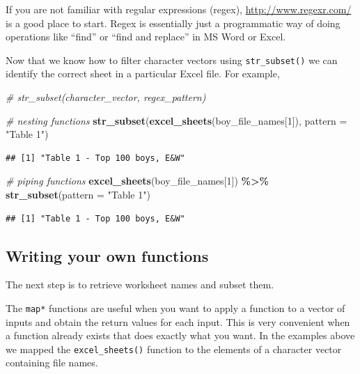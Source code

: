 \documentclass[
]{book}
\newenvironment{Shaded}{\begin{snugshade}}{\end{snugshade}}
\newcommand{\CommentTok}[1]{\textcolor[rgb]{0.56,0.35,0.01}{\textit{#1}}}
\newcommand{\DataTypeTok}[1]{\textcolor[rgb]{0.13,0.29,0.53}{#1}}
\newcommand{\DecValTok}[1]{\textcolor[rgb]{0.00,0.00,0.81}{#1}}
\newcommand{\KeywordTok}[1]{\textcolor[rgb]{0.13,0.29,0.53}{\textbf{#1}}}
\newcommand{\NormalTok}[1]{#1}
\newcommand{\OperatorTok}[1]{\textcolor[rgb]{0.81,0.36,0.00}{\textbf{#1}}}
\newcommand{\StringTok}[1]{\textcolor[rgb]{0.31,0.60,0.02}{#1}}
\begin{document}
If you are not familiar with regular expressions (regex),
\url{http://www.regexr.com/} is a good place to start. Regex is essentially
just a programmatic way of doing operations like ``find'' or ``find and replace''
in MS Word or Excel.

Now that we know how to filter character vectors using \texttt{str\_subset()} we can
identify the correct sheet in a particular Excel file. For example,

\begin{Shaded}
\begin{Highlighting}[]
\CommentTok{\# str\_subset(character\_vector, regex\_pattern)}

\CommentTok{\# nesting functions}
\KeywordTok{str\_subset}\NormalTok{(}\KeywordTok{excel\_sheets}\NormalTok{(boy\_file\_names[}\DecValTok{1}\NormalTok{]), }\DataTypeTok{pattern =} \StringTok{"Table 1"}\NormalTok{)}
\end{Highlighting}
\end{Shaded}

\begin{verbatim}
## [1] "Table 1 - Top 100 boys, E&W"
\end{verbatim}

\begin{Shaded}
\begin{Highlighting}[]
\CommentTok{\# piping functions}
\KeywordTok{excel\_sheets}\NormalTok{(boy\_file\_names[}\DecValTok{1}\NormalTok{]) }\OperatorTok{\%\textgreater{}\%}\StringTok{ }\KeywordTok{str\_subset}\NormalTok{(}\DataTypeTok{pattern =} \StringTok{"Table 1"}\NormalTok{)}
\end{Highlighting}
\end{Shaded}

\begin{verbatim}
## [1] "Table 1 - Top 100 boys, E&W"
\end{verbatim}

\hypertarget{writing-your-own-functions}{%
\subsection{Writing your own functions}\label{writing-your-own-functions}}

The next step is to retrieve worksheet names and subset them.

The \texttt{map*} functions are useful when you want to apply a function to a
vector of inputs and obtain the return values for each input. This
is very convenient when a function already exists that does exactly what you
want. In the examples above we mapped the \texttt{excel\_sheets()} function to
the elements of a character vector containing file names.
\end{document}

